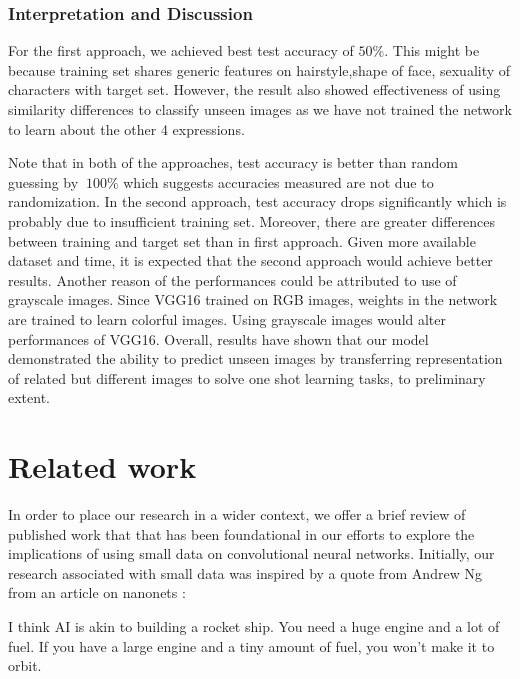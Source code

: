 \documentclass{article}
\begin{document}
\subsubsection{\textbf{Interpretation and Discussion}}

For the first approach, we achieved best test accuracy of $50\%$. This might be because training set shares generic features on hairstyle,shape of face, sexuality of characters with target set. However, the result also showed effectiveness of using similarity differences to classify unseen images as we have not trained the network to learn about the other 4 expressions.

Note that in both of the approaches, test accuracy is better than random guessing by $~100\%$ which suggests accuracies measured are not due to randomization. In the second approach, test accuracy drops significantly which is probably due to insufficient training set. Moreover, there are greater differences between training and target set than in first approach. Given more available dataset and time, it is expected that the second approach would achieve better results. Another reason of the performances could be attributed to use of grayscale images. Since VGG16 trained on RGB images, weights in the network are trained to learn colorful images. Using grayscale images would alter performances of VGG16. Overall, results have shown that our model demonstrated the ability to predict unseen images by transferring representation of related but different images to solve one shot learning tasks, to preliminary extent.

\section{Related work}
\label{sec:related}

In order to place our research in a wider context, we offer a brief review of published work that that has been foundational in our efforts to explore the implications of using small data on convolutional neural networks. Initially, our research associated with small data was inspired by a quote from Andrew Ng from an article on nanonets \cite{nanoNets}:

\begin{displayquote}
I think AI is akin to building a rocket ship. You need a huge engine and a lot of fuel. If you have a large engine and a tiny amount of fuel, you won’t make it to orbit.
\end{displayquote}
\end{document}
